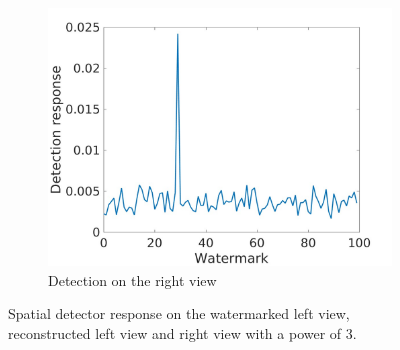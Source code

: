 \begin{figure}[h!]
\begin{subfigure}[t]{0.5\textwidth}
\includegraphics[width=1\textwidth]{./img/corr_gauss/right_warped_corr_value_3.jpg}
   \caption{\small{Detection on the right view}\label{fig:gr3}}
\end{subfigure}
\caption{Spatial detector response on the watermarked left view, reconstructed left view and right view with a power of 3.\label{fig:gauss3}}
\end{figure}

